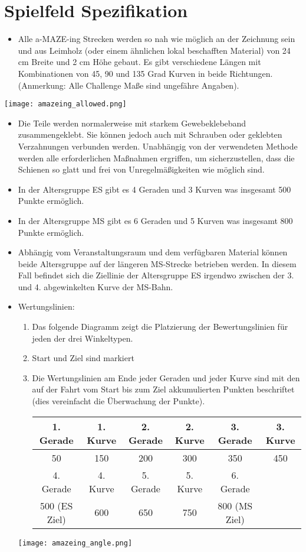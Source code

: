 \documentclass[a4paper,12pt]{article}
\begin{document}
\section{Spielfeld Spezifikation}
\begin{itemize}
	\item Alle a-MAZE-ing Strecken werden so nah wie möglich an der
		Zeichnung sein und aus Leimholz (oder einem ähnlichen lokal
		beschafften Material) von 24 cm Breite und 2 cm Höhe gebaut. Es
		gibt verschiedene Längen mit Kombinationen von 45, 90 und 135
		Grad Kurven in beide Richtungen. (Anmerkung: Alle Challenge
		Maße sind ungefähre Angaben).
\end{itemize}
\texttt{[image: amazeing\_allowed.png]}
\begin{itemize}
	\item Die Teile werden normalerweise mit starkem Gewebeklebeband
		zusammengeklebt. Sie können jedoch auch mit Schrauben oder
		geklebten Verzahnungen verbunden werden. Unabhängig von der
		verwendeten Methode werden alle erforderlichen Maßnahmen
		ergriffen, um sicherzustellen, dass die Schienen so glatt und
		frei von Unregelmäßigkeiten wie möglich sind.
	\item In der Altersgruppe ES gibt es 4 Geraden und 3 Kurven was
		insgesamt 500 Punkte ermöglich.
	\item In der Altersgruppe MS gibt es 6 Geraden und 5 Kurven was
		insgesamt 800 Punkte ermöglich.
	\item Abhängig vom Veranstaltungsraum und dem verfügbaren Material
		können beide Altersgruppe auf der längeren MS-Strecke betrieben
		werden. In diesem Fall befindet sich die Ziellinie der
		Altersgruppe ES irgendwo zwischen der 3. und 4. abgewinkelten
		Kurve der MS-Bahn.
	\item Wertungslinien:
		\begin{enumerate}
			\item Das folgende Diagramm zeigt die Platzierung der
				Bewertungslinien für jeden der drei
				Winkeltypen.
			\item Start und Ziel sind markiert
			\item Die Wertungslinien am Ende jeder Geraden und
				jeder Kurve sind mit den auf der Fahrt vom
				Start bis zum Ziel akkumulierten Punkten
				beschriftet (dies vereinfacht die Überwachung
				der Punkte).
				\begin{center}
					\begin{tabular}{|c|c|c|c|c|c|} \hline
						\rowcolor{Gray}
						1. Gerade & 1. Kurve & 2. Gerade & 2. Kurve & 3. Gerade & 3. Kurve  \\ \hline
						50 & 150 & 200 & 300 & 350 & 450  \\ \hline
						\rowcolor{Gray}
						4. Gerade & 4. Kurve & 5. Gerade & 5. Kurve & 6. Gerade & \\ \hline
						500 (ES Ziel) & 600 & 650 & 750 & 800 (MS Ziel) & \\ \hline
					\end{tabular}
				\end{center}
		\end{enumerate}
		\texttt{[image: amazeing\_angle.png]}
\end{itemize}
\end{document}
